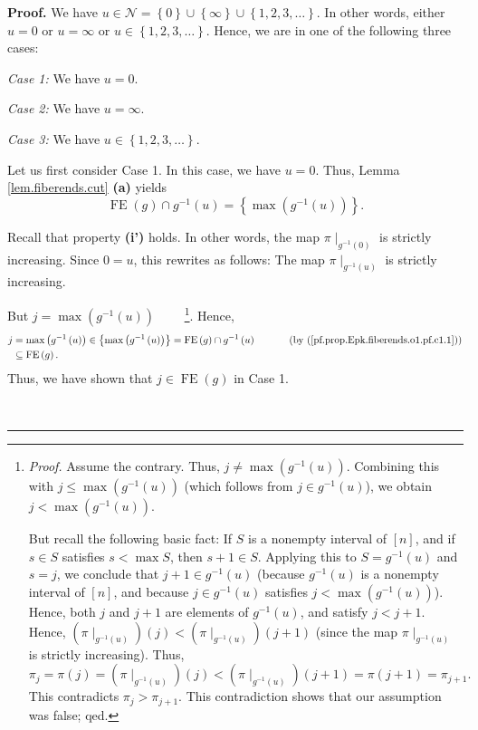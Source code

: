 \documentclass[numbers=enddot,12pt,final,onecolumn,notitlepage]{scrartcl}%
\theoremstyle{definition}
\newenvironment{proof}[1][Proof]{\noindent\textbf{#1.} }{\ \rule{0.5em}{0.5em}}
\newenvironment{verlong}{}{}
\begin{document}
\begin{verlong}
\begin{proof}
We have $u\in\mathcal{N}=\left\{  0\right\}  \cup\left\{  \infty\right\}
\cup\left\{  1,2,3,\ldots\right\}  $. In other words, either $u=0$ or
$u=\infty$ or $u\in\left\{  1,2,3,\ldots\right\}  $. Hence, we are in one of
the following three cases:

\textit{Case 1:} We have $u=0$.

\textit{Case 2:} We have $u=\infty$.

\textit{Case 3:} We have $u\in\left\{  1,2,3,\ldots\right\}  $.

Let us first consider Case 1. In this case, we have $u=0$. Thus, Lemma
\ref{lem.fiberends.cut} \textbf{(a)} yields
\begin{equation}
\operatorname*{FE}\left(  g\right)  \cap g^{-1}\left(  u\right)  =\left\{
\max\left(  g^{-1}\left(  u\right)  \right)  \right\}  .
\label{pf.prop.Epk.fiberends.o1.pf.c1.1}%
\end{equation}


Recall that property \textbf{(i')} holds. In other words, the map $\pi
\mid_{g^{-1}\left(  0\right)  }$ is strictly increasing. Since $0=u$, this
rewrites as follows: The map $\pi\mid_{g^{-1}\left(  u\right)  }$ is strictly increasing.

But $j=\max\left(  g^{-1}\left(  u\right)  \right)  $%
\ \ \ \ \footnote{\textit{Proof.} Assume the contrary. Thus, $j\neq\max\left(
g^{-1}\left(  u\right)  \right)  $. Combining this with $j\leq\max\left(
g^{-1}\left(  u\right)  \right)  $ (which follows from $j\in g^{-1}\left(
u\right)  $), we obtain $j<\max\left(  g^{-1}\left(  u\right)  \right)  $.
\par
But recall the following basic fact: If $S$ is a nonempty interval of $\left[
n\right]  $, and if $s\in S$ satisfies $s<\max S$, then $s+1\in S$. Applying
this to $S=g^{-1}\left(  u\right)  $ and $s=j$, we conclude that $j+1\in
g^{-1}\left(  u\right)  $ (because $g^{-1}\left(  u\right)  $ is a nonempty
interval of $\left[  n\right]  $, and because $j\in g^{-1}\left(  u\right)  $
satisfies $j<\max\left(  g^{-1}\left(  u\right)  \right)  $). Hence, both $j$
and $j+1$ are elements of $g^{-1}\left(  u\right)  $, and satisfy $j<j+1$.
Hence, $\left(  \pi\mid_{g^{-1}\left(  u\right)  }\right)  \left(  j\right)
<\left(  \pi\mid_{g^{-1}\left(  u\right)  }\right)  \left(  j+1\right)  $
(since the map $\pi\mid_{g^{-1}\left(  u\right)  }$ is strictly increasing).
Thus,%
\[
\pi_{j}=\pi\left(  j\right)  =\left(  \pi\mid_{g^{-1}\left(  u\right)
}\right)  \left(  j\right)  <\left(  \pi\mid_{g^{-1}\left(  u\right)
}\right)  \left(  j+1\right)  =\pi\left(  j+1\right)  =\pi_{j+1}.
\]
This contradicts $\pi_{j}>\pi_{j+1}$. This contradiction shows that our
assumption was false; qed.}. Hence,%
\begin{align*}
j  &  =\max\left(  g^{-1}\left(  u\right)  \right)  \in\left\{  \max\left(
g^{-1}\left(  u\right)  \right)  \right\}  =\operatorname*{FE}\left(
g\right)  \cap g^{-1}\left(  u\right)  \ \ \ \ \ \ \ \ \ \ \left(  \text{by
(\ref{pf.prop.Epk.fiberends.o1.pf.c1.1})}\right) \\
&  \subseteq\operatorname*{FE}\left(  g\right)  .
\end{align*}
Thus, we have shown that $j\in\operatorname*{FE}\left(  g\right)  $ in Case 1.


\end{proof}
\end{verlong}
\end{document}
